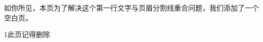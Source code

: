 \documentclass[a4paper,zihao = -4]{ctexart}
\numberwithin{equation}{section}
\numberwithin{table}{section}
\numberwithin{figure}{section}
\begin{document}
\newtheorem{example}{例}              %
\newtheorem{algorithm}{算法}
\newtheorem{theorem}{定理}            %
\newtheorem{definition}{定义}
\newtheorem{axiom}{公理}
\newtheorem{property}{性质}
\newtheorem{proposition}{命题}
\newtheorem{lemma}{引理}
\newtheorem{corollary}{推论}
\newtheorem{remark}{注解}
\newtheorem{condition}{条件}
\newtheorem{conclusion}{结论}
\newtheorem{assumption}{假设}
\renewcommand{\contentsname}{目 ~~ 录}     
\renewcommand{\abstractname}{摘 ~~ 要} 
\renewcommand{\refname}{参考文献}     
\renewcommand{\indexname}{索引}
\renewcommand{\figurename}{图}
\renewcommand{\tablename}{表}
\renewcommand{\appendixname}{附录}
\renewcommand{\proofname}{证明}
\renewcommand{\algorithm}{算法} 

\pagestyle{plain}



\pagestyle{empty}
\tableofcontents 
\thispagestyle{empty}

\pagestyle{fancy}
\fancyhf{} 
\setlength{\headsep}{20pt}
\setlength{\headheight}{0cm}
\setlength{\textwidth}{\paperwidth - 4.5cm}
\setlength{\textheight}{\paperheight - 6.08cm - \headsep - \footskip}
\setlength\topmargin{0.17cm}
\renewcommand{\headrulewidth}{0.65pt} 

\newpage
如你所见，本页为了解决这个第一行文字与页眉分割线重合问题，我们添加了一个空白页。
\vspace*{\fill}
\begin{center}   
	{\color{red}\fontsize{50} 1此页记得删除}
\end{center}
\vspace*{\fill}
\newpage

\setlength{\lineskip}{20pt} %
\setlength{\parskip}{0.5\baselineskip - 10pt} %

 




\clearpage


\end{document}
